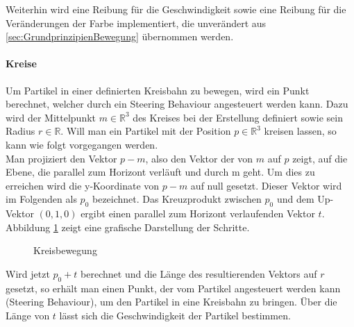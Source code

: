 \documentclass[11pt,a4paper]{article}
\begin{document}
\noindent
Weiterhin wird eine Reibung für die Geschwindigkeit sowie eine Reibung für die Veränderungen der Farbe implementiert, die unverändert aus \ref{sec:GrundprinzipienBewegung} übernommen werden.

\paragraph{Kreise}
Um Partikel in einer definierten Kreisbahn zu bewegen, wird ein Punkt berechnet, welcher durch ein Steering Behaviour angesteuert werden kann.
Dazu wird der Mittelpunkt $m \in \mathbb{R}^3$ des Kreises bei der Erstellung definiert sowie sein Radius $r \in \mathbb{R}$. Will man ein Partikel mit der Position $p \in \mathbb{R}^3$ kreisen lassen, so kann wie folgt vorgegangen werden.\\
Man projiziert den Vektor $p - m$, also den Vektor der von $m$ auf $p$ zeigt, auf die Ebene, die parallel zum Horizont verläuft und durch m geht. Um dies zu erreichen wird die y-Koordinate von $p - m$ auf null gesetzt. Dieser Vektor wird im Folgenden als $p_0$ bezeichnet. Das Kreuzprodukt zwischen $p_0$ und dem Up-Vektor $(0, 1, 0)$ ergibt einen parallel zum Horizont verlaufenden Vektor $t$. Abbildung \ref{fig:kreisberechnung} zeigt eine grafische Darstellung der Schritte.
\begin{center}
\begin{figure}[!ht]
\centering
\vspace{20pt}
\caption[Kreisbewegung]{Kreisbewegung}
\label{fig:kreisberechnung}
\end{figure}
\end{center}
\noindent
Wird jetzt $p_0+t$ berechnet und die Länge des resultierenden Vektors auf $r$ gesetzt, so erhält man einen Punkt, der vom Partikel angesteuert werden kann (Steering Behaviour), um den Partikel in eine Kreisbahn zu bringen. Über die Länge von $t$ lässt sich die Geschwindigkeit der Partikel bestimmen.

\newpage
\end{document}
